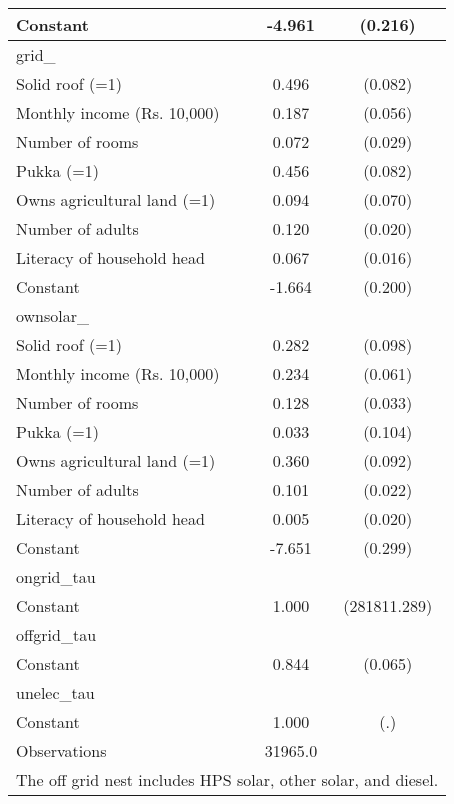 \begin{table}[htbp]
\begin{tabular}{l*{1}{cc}}
Constant            &      -4.961\sym{***}&     (0.216)\\
\midrule
grid\_               &                     &            \\
Solid roof (=1)     &       0.496\sym{***}&     (0.082)\\
Monthly income (Rs. 10,000)&       0.187\sym{***}&     (0.056)\\
Number of rooms     &       0.072\sym{**} &     (0.029)\\
Pukka (=1)          &       0.456\sym{***}&     (0.082)\\
Owns agricultural land (=1)&       0.094         &     (0.070)\\
Number of adults    &       0.120\sym{***}&     (0.020)\\
Literacy of household head&       0.067\sym{***}&     (0.016)\\
Constant            &      -1.664\sym{***}&     (0.200)\\
\midrule
ownsolar\_           &                     &            \\
Solid roof (=1)     &       0.282\sym{***}&     (0.098)\\
Monthly income (Rs. 10,000)&       0.234\sym{***}&     (0.061)\\
Number of rooms     &       0.128\sym{***}&     (0.033)\\
Pukka (=1)          &       0.033         &     (0.104)\\
Owns agricultural land (=1)&       0.360\sym{***}&     (0.092)\\
Number of adults    &       0.101\sym{***}&     (0.022)\\
Literacy of household head&       0.005         &     (0.020)\\
Constant            &      -7.651\sym{***}&     (0.299)\\
\midrule
ongrid\_tau          &                     &            \\
Constant            &       1.000         &(281811.289)\\
\midrule
offgrid\_tau         &                     &            \\
Constant            &       0.844\sym{***}&     (0.065)\\
\midrule
unelec\_tau          &                     &            \\
Constant            &       1.000         &         (.)\\
\midrule
Observations        &     31965.0         &            \\
\bottomrule
\multicolumn{3}{l}{\footnotesize The off grid nest includes HPS solar, other solar, and diesel.}\\
\end{tabular}
\end{table}

